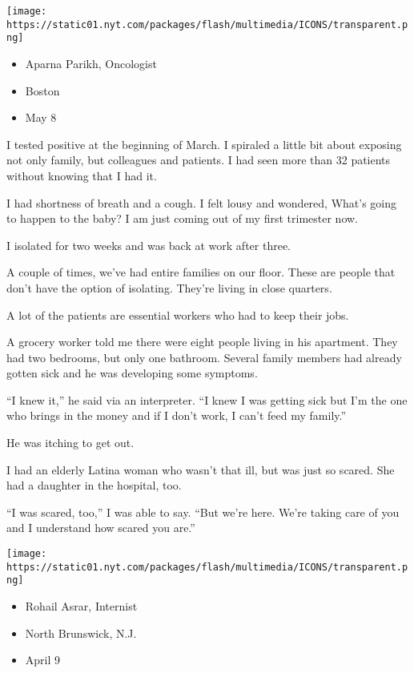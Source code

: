 \texttt{[image: https://static01.nyt.com/packages/flash/multimedia/ICONS/transparent.png]}

\begin{itemize}
\tightlist
\item
  Aparna Parikh, Oncologist
\item
  Boston
\item
  May 8
\end{itemize}

I tested positive at the beginning of March. I spiraled a little bit
about exposing not only family, but colleagues and patients. I had seen
more than 32 patients without knowing that I had it.

I had shortness of breath and a cough. I felt lousy and wondered, What's
going to happen to the baby? I am just coming out of my first trimester
now.

I isolated for two weeks and was back at work after three.

A couple of times, we've had entire families on our floor. These are
people that don't have the option of isolating. They're living in close
quarters.

A lot of the patients are essential workers who had to keep their jobs.

A grocery worker told me there were eight people living in his
apartment. They had two bedrooms, but only one bathroom. Several family
members had already gotten sick and he was developing some symptoms.

``I knew it,'' he said via an interpreter. ``I knew I was getting sick
but I'm the one who brings in the money and if I don't work, I can't
feed my family.''

He was itching to get out.

I had an elderly Latina woman who wasn't that ill, but was just so
scared. She had a daughter in the hospital, too.

``I was scared, too,'' I was able to say. ``But we're here. We're taking
care of you and I understand how scared you are.''

\texttt{[image: https://static01.nyt.com/packages/flash/multimedia/ICONS/transparent.png]}

\begin{itemize}
\tightlist
\item
  Rohail Asrar, Internist
\item
  North Brunswick, N.J.
\item
  April 9
\end{itemize}

